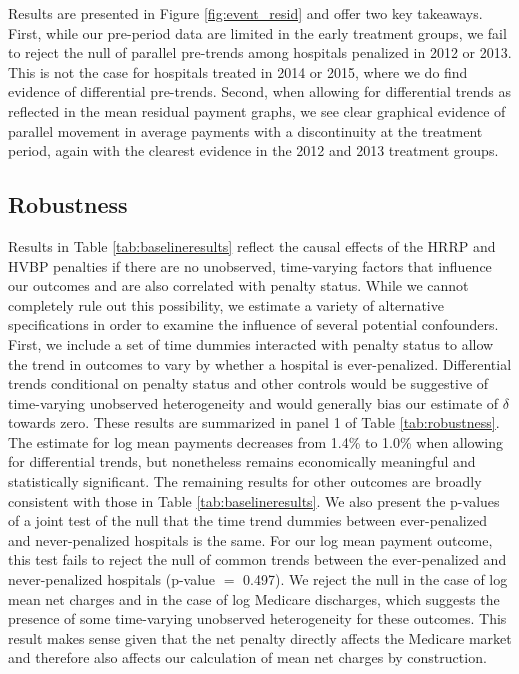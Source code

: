 \documentclass[12pt]{article}
\begin{document}
Results are presented in Figure \ref{fig:event_resid} and offer two key takeaways. First, while our pre-period data are limited in the early treatment groups, we fail to reject the null of parallel pre-trends among hospitals penalized in 2012 or 2013. This is not the case for hospitals treated in 2014 or 2015, where we do find evidence of differential pre-trends. Second, when allowing for differential trends as reflected in the mean residual payment graphs, we see clear graphical evidence of parallel movement in average payments with a discontinuity at the treatment period, again with the clearest evidence in the 2012 and 2013 treatment groups.




\subsection{Robustness}
\label{sec:robust}
Results in Table \ref{tab:baselineresults} reflect the causal effects of the HRRP and HVBP penalties if there are no unobserved, time-varying factors that influence our outcomes and are also correlated with penalty status.  While we cannot completely rule out this possibility, we estimate a variety of alternative specifications in order to examine the influence of several potential confounders.  First, we include a set of time dummies interacted with penalty status to allow the trend in outcomes to vary by whether a hospital is ever-penalized. Differential trends conditional on penalty status and other controls would be suggestive of time-varying unobserved heterogeneity and would generally bias our estimate of $\delta$ towards zero.  These results are summarized in panel 1 of Table \ref{tab:robustness}. The estimate for log mean payments decreases from 1.4\% to 1.0\% when allowing for differential trends, but nonetheless remains economically meaningful and statistically significant. The remaining results for other outcomes are broadly consistent with those in Table \ref{tab:baselineresults}. We also present the p-values of a joint test of the null that the time trend dummies between ever-penalized and never-penalized hospitals is the same. For our log mean payment outcome, this test fails to reject the null of common trends between the ever-penalized and never-penalized hospitals (p-value $=$ 0.497). We reject the null in the case of log mean net charges and in the case of log Medicare discharges, which suggests the presence of some time-varying unobserved heterogeneity for these outcomes. This result makes sense given that the net penalty directly affects the Medicare market and therefore also affects our calculation of mean net charges by construction.
\end{document}
